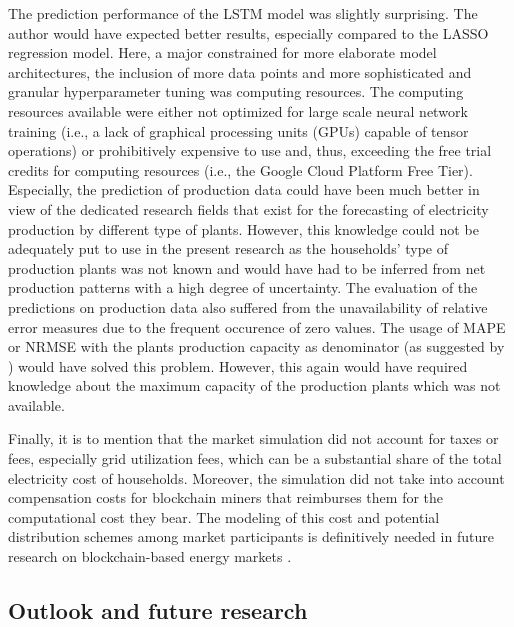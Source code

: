 The prediction performance of the LSTM model was slightly surprising. The author would have expected better results, especially compared to the LASSO regression model. Here, a major constrained for more elaborate model architectures, the inclusion of more data points and more sophisticated and granular hyperparameter tuning was computing resources. The computing resources available were either not optimized for large scale neural network training (i.e., a lack of graphical processing units (GPUs) capable of tensor operations) or prohibitively expensive to use and, thus, exceeding the free trial credits for computing resources (i.e., the Google Cloud Platform Free Tier). Especially, the prediction of production data could have been much better in view of the dedicated research fields that exist for the forecasting of electricity production by different type of plants. However, this knowledge could not be adequately put to use in the present research as the households' type of production plants was not known and would have had to be inferred from net production patterns with a high degree of uncertainty. The evaluation of the predictions on production data also suffered from the unavailability of relative error measures due to the frequent occurence of zero values. The usage of MAPE or NRMSE with the plants production capacity as denominator (as suggested by \citet{Hoff:2013}) would have solved this problem. However, this again would have required knowledge about the maximum capacity of the production plants which was not available.

Finally, it is to mention that the market simulation did not account for taxes or fees, especially grid utilization fees, which can be a substantial share of the total electricity cost of households. Moreover, the simulation did not take into account compensation costs for blockchain miners that reimburses them for the computational cost they bear. The modeling of this cost and potential distribution schemes among market participants is definitively needed in future research on blockchain-based energy markets \citep[see also][]{Mengelkamp:2018a}.




\subsection{Outlook and future research}\label{Sec:Conclusion;Subsec:Outlook}

